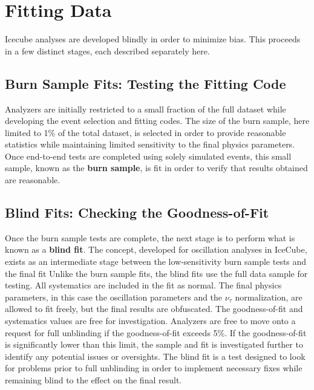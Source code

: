 \graphicspath{{chapters/analysis/images/}}
\label{sec:fitting_data}
\section{Fitting Data}
Icecube analyses are developed blindly in order to minimize bias.
This proceeds in a few distinct stages, each described separately here.

\label{subsec:burn_sample}
\subsection{Burn Sample Fits: Testing the Fitting Code}
Analyzers are initially restricted to a small fraction of the full dataset while developing the event selection and fitting codes.
The size of the burn sample, here limited to 1\% of the total dataset, is selected in order to provide reasonable statistics while maintaining limited sensitivity to the final physics parameters.
Once end-to-end tests are completed using solely simulated events, this small sample, known as the \textbf{burn sample}, is fit in order to verify that results obtained are reasonable.



\label{subsec:blind_fits}
\subsection{Blind Fits: Checking the Goodness-of-Fit}
Once the burn sample tests are complete, the next stage is to perform what is known as a \textbf{blind fit}.
The concept, developed for oscillation analyses in IceCube, exists as an intermediate stage between the low-sensitivity burn sample tests and the final fit 
Unlike the burn sample fits, the blind fits use the full data sample for testing.
All systematics are included in the fit as normal.
The final physics parameters, in this case the oscillation parameters and the $\nu_\tau$ normalization, are allowed to fit freely, but the final results are obfuscated.
The goodness-of-fit and systematics values are free for investigation.
Analyzers are free to move onto a request for full unblinding if the goodness-of-fit exceeds 5\%.
If the goodness-of-fit is significantly lower than this limit, the sample and fit is investigated further to identify any potential issues or oversights.
The blind fit is a test designed to look for problems prior to full unblinding in order to implement necessary fixes while remaining blind to the effect on the final result.


